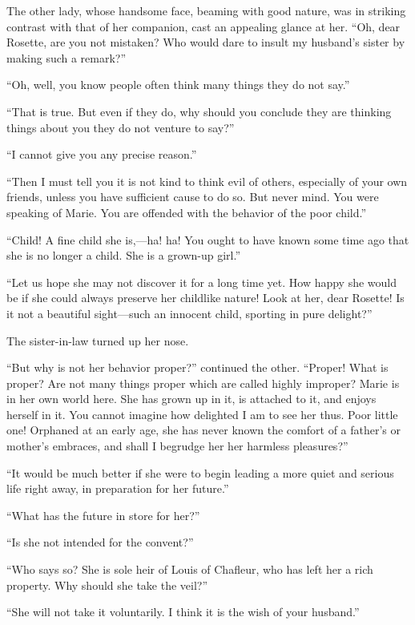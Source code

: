 The other lady, whose handsome face, beaming with good nature, was in
striking contrast with that of her companion, cast an appealing glance
at her. ``Oh, dear Rosette, are you not mistaken? Who would dare to
insult my husband's sister by making such a remark?''

``Oh, well, you know people often think many things they do not say.''

``That is true. But even if they do, why should you conclude they are
thinking things about you they do not venture to say?''

``I cannot give you any precise reason.''

``Then I must tell you it is not kind to think evil of others,
especially of your own friends, unless you have sufficient cause to do
so. But never mind. You were speaking of Marie. You are offended with
the behavior of the poor child.''

``Child! A fine child she is,---ha! ha! You ought to have known some
time ago that she is no longer a child. She is a grown-up girl.''

``Let us hope she may not discover it for a long time yet. How happy she
would be if she could always preserve her childlike nature! Look at her,
dear Rosette! Is it not a beautiful sight---such an innocent child,
sporting in pure delight?''

The sister-in-law turned up her nose.

``But why is not her behavior proper?'' continued the other. ``Proper!
What is proper? Are not many things proper which are called highly
improper? Marie is in her own world here. She has grown up in it, is
attached to it, and enjoys herself in it. You cannot imagine how
delighted I am to see her thus. Poor little one! Orphaned at an early
age, she has never known the comfort of a father's or mother's embraces,
and shall I begrudge her her harmless pleasures?''

``It would be much better if she were to begin leading a more quiet and
serious life right away, in preparation for her future.''

``What has the future in store for her?''

``Is she not intended for the convent?''

``Who says so? She is sole heir of Louis of Chafleur, who has left her a
rich property. Why should she take the veil?''

``She will not take it voluntarily. I think it is the wish of your
husband.''

